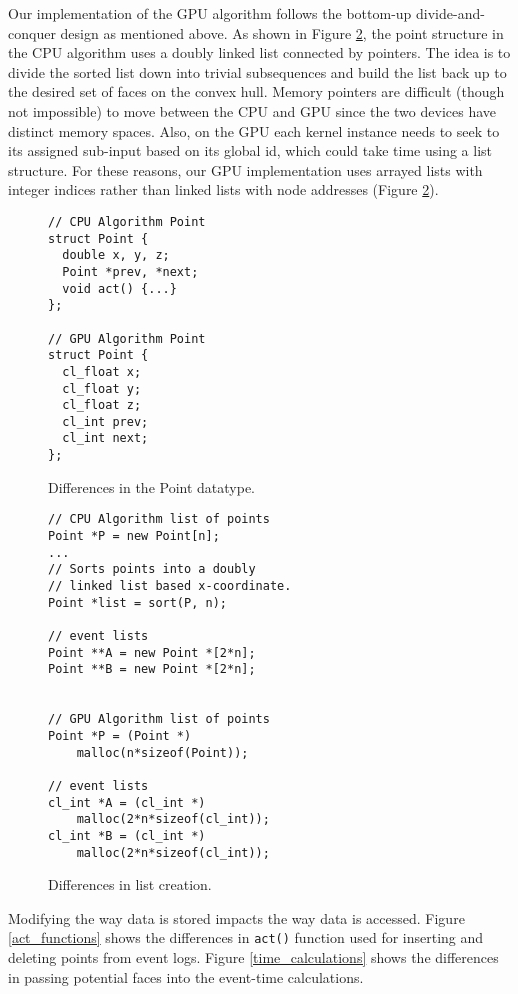 \documentclass{article}
\begin{document}
Our implementation of the GPU algorithm follows the bottom-up divide-and-conquer design as mentioned above. As shown in Figure \ref{point_lists}, the point structure in the CPU algorithm uses a doubly linked list connected by pointers. The idea is to divide the sorted list down into trivial subsequences and build the list back up to the desired set of faces on the convex hull. Memory pointers are difficult (though not impossible) to move between the CPU and GPU since the two devices have distinct memory spaces. Also, on the GPU each kernel instance needs to seek to its assigned sub-input based on its global id, which could take  time using a list structure. For these reasons, our GPU implementation uses arrayed lists with integer indices rather than linked lists with node addresses (Figure \ref{point_lists}).

\begin{figure}
\begin{lstlisting}
// CPU Algorithm Point
struct Point {
  double x, y, z;
  Point *prev, *next;
  void act() {...}
};

// GPU Algorithm Point
struct Point { 
  cl_float x;
  cl_float y;
  cl_float z;  
  cl_int prev;
  cl_int next;
};
\end{lstlisting}
\caption{Differences in the Point datatype.}
\label{point_datatypes}
\end{figure}

\begin{figure}
\begin{lstlisting}
// CPU Algorithm list of points
Point *P = new Point[n];
...
// Sorts points into a doubly 
// linked list based x-coordinate.
Point *list = sort(P, n);

// event lists
Point **A = new Point *[2*n];
Point **B = new Point *[2*n];


// GPU Algorithm list of points
Point *P = (Point *) 
    malloc(n*sizeof(Point));

// event lists
cl_int *A = (cl_int *) 
    malloc(2*n*sizeof(cl_int));
cl_int *B = (cl_int *) 
    malloc(2*n*sizeof(cl_int));
\end{lstlisting}
\caption{Differences in list creation.}
\label{point_lists}
\end{figure}

Modifying the way data is stored impacts the way data is accessed. Figure \ref{act_functions} shows the differences in \texttt{act()} function used for inserting and deleting points from event logs. Figure \ref{time_calculations} shows the differences in passing potential faces into the event-time calculations.
\end{document}

